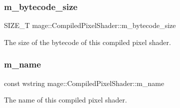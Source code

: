 \subsubsection{\texorpdfstring{m\+\_\+bytecode\+\_\+size}{m\_bytecode\_size}}
{\footnotesize\ttfamily S\+I\+Z\+E\+\_\+T mage\+::\+Compiled\+Pixel\+Shader\+::m\+\_\+bytecode\+\_\+size}

The size of the bytecode of this compiled pixel shader. \hypertarget{structmage_1_1_compiled_pixel_shader_ae87a10c9288429db9a607182a0ef2b39}{}\label{structmage_1_1_compiled_pixel_shader_ae87a10c9288429db9a607182a0ef2b39} 
\subsubsection{\texorpdfstring{m\+\_\+name}{m\_name}}
{\footnotesize\ttfamily const wstring mage\+::\+Compiled\+Pixel\+Shader\+::m\+\_\+name}

The name of this compiled pixel shader. 